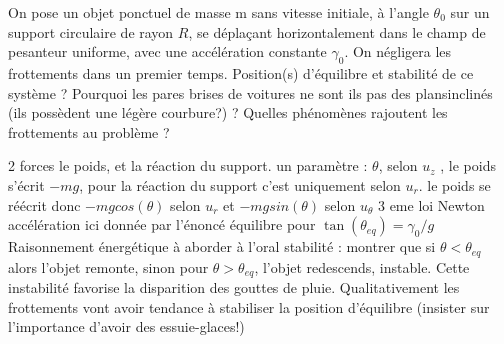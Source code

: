 \begin{Exercise}[title=Goutte de pluie et pare brise]
  On pose un objet ponctuel de masse m sans vitesse initiale, à l'angle
  $\theta_0$ sur un support circulaire de rayon $R$, se déplaçant horizontalement
  dans le champ de pesanteur uniforme, avec une accélération
  constante $\gamma_0$. On négligera les frottements dans un premier temps.
  \Question Position(s) d'équilibre et stabilité de ce système ?
  \Question Pourquoi les pares brises de voitures ne sont ils pas des
  plansinclinés (ils possèdent une légère courbure?) ?
  \Question Quelles phénomènes rajoutent les frottements au problème ?

\end{Exercise}
\begin{Answer}
 2 forces le poids, et la réaction du support. un paramètre : $\theta$, selon $u_z$ ,
 le poids s'écrit $-mg$, pour la réaction du support c’est uniquement selon
 $u_r$.
  le poids se réécrit donc $-mg cos(\theta)$ selon $u_r$ et $-mg sin(\theta)$  selon $u_\theta$
 3 eme loi Newton accélération ici donnée par l'énoncé équilibre pour $\tan(\theta_{eq}) = \gamma_0/ g$
 Raisonnement énergétique à aborder à l'oral
 stabilité : montrer que si $\theta< \theta_{eq}$ alors l'objet remonte, sinon pour $\theta >
 \theta_{eq}$, l'objet redescends, instable.
 Cette instabilité favorise la disparition des gouttes de pluie.
 Qualitativement les frottements vont avoir tendance à stabiliser la position
 d'équilibre (insister sur l'importance d'avoir des essuie-glaces!)
\end{Answer}
